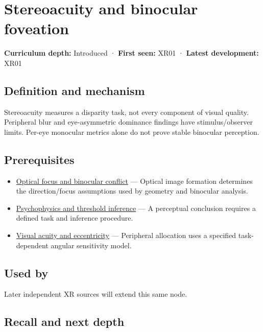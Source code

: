 \hypertarget{appendix-8dc848f14052}{}\label{referencestart:appendix-8dc848f14052}
\section{Stereoacuity and binocular foveation}\label{appendix-8dc848f14052-stereoacuity-and-binocular-foveation}

\textbf{Curriculum depth:} Introduced · \textbf{First seen:} XR01 · \textbf{Latest development:} XR01

\subsection{Definition and mechanism}\label{appendix-8dc848f14052-definition-and-mechanism}

Stereoacuity measures a disparity task, not every component of visual quality. Peripheral blur and eye-asymmetric dominance findings have stimulus/observer limits. Per-eye monocular metrics alone do not prove stable binocular perception.

\subsection{Prerequisites}\label{appendix-8dc848f14052-prerequisites}

\begin{itemize}
\tightlist
\item
  \hyperref[appendix-f90cee1be7a4]{Optical focus and binocular conflict} --- Optical image formation determines the direction/focus assumptions used by geometry and binocular analysis.
\item
  \hyperref[appendix-1759f03e8ce7]{Psychophysics and threshold inference} --- A perceptual conclusion requires a defined task and inference procedure.
\item
  \hyperref[appendix-b491fc48c54b]{Visual acuity and eccentricity} --- Peripheral allocation uses a specified task-dependent angular sensitivity model.
\end{itemize}

\subsection{Used by}\label{appendix-8dc848f14052-used-by}

Later independent XR sources will extend this same node.

\subsection{Recall and next depth}\label{appendix-8dc848f14052-recall-and-next-depth}

